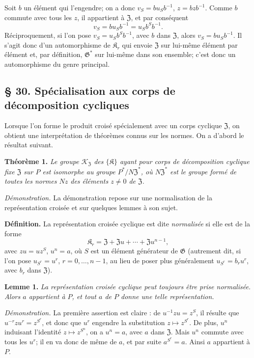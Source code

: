 Soit \(b\) un élément qui l'engendre; on a donc \(v_S=bu_Sb^{-1}\), \(z=bzb^{-1}\). Comme \(b\) commute avec tous les \(z\), il appartient à \(\mathfrak Z\), et par conséquent
\[
v_S=bu_Sb^{-1}=u_Sb^Sb^{-1}.
\]
Réciproquement, si l'on pose \(v_S=u_Sb^Sb^{-1}\), avec \(b\) dans \(\mathfrak Z\), alors \(v_S=bu_Sb^{-1}\). Il s'agit donc d'un automorphisme de \(\mathfrak K_r\) qui envoie \(\mathfrak Z\) sur lui-même élément par élément et, par définition, \(\mathfrak G^*\) sur lui-même dans son ensemble; c'est donc un automorphisme du genre principal.

\subsection*{\S{} 30. Spécialisation aux corps de décomposition cycliques}\label{fr-r823-corps-decomposition-cycliques}

Lorsque l'on forme le produit croisé spécialement avec un corps cyclique \(\mathfrak Z\), on obtient une interprétation de théorèmes connus sur les normes. On a d'abord le résultat suivant.

\noindent\textbf{Théorème 1.} \emph{Le groupe \(\mathscr K_{\mathfrak Z}\) des \(\{\mathfrak K\}\) ayant pour corps de décomposition cyclique fixe \(\mathfrak Z\) sur \(P\) est isomorphe au groupe \(P^*/N\mathfrak Z^*\), où \(N\mathfrak Z^*\) est le groupe formé de toutes les normes \(Nz\) des éléments \(z\neq0\) de \(\mathfrak Z\).}

\noindent\emph{Démonstration.} La démonstration repose sur une normalisation de la représentation croisée et sur quelques lemmes à son sujet.

\noindent\textbf{Définition.} La représentation croisée cyclique est dite \emph{normalisée} si elle est de la forme
\[
\mathfrak K_r=\mathfrak Z+\mathfrak Zu+\cdots+\mathfrak Zu^{n-1},
\]
avec \(zu=uz^S\), \(u^n=a\), où \(S\) est un élément générateur de \(\mathfrak G\) (autrement dit, si l'on pose \(u_{S^r}=u^r\), \(r=0,\ldots,n-1\), au lieu de poser plus généralement \(u_{S^r}=b_ru^r\), avec \(b_r\) dans \(\mathfrak Z\)).

\noindent\textbf{Lemme 1.} \emph{La représentation croisée cyclique peut toujours être prise normalisée. Alors \(a\) appartient à \(P\), et tout \(a\) de \(P\) donne une telle représentation.}

\noindent\emph{Démonstration.} La première assertion est claire : de \(u^{-1}zu=z^S\), il résulte que \(u^{-r}zu^r=z^{S^r}\), et donc que \(u^r\) engendre la substitution \(z\mapsto z^{S^r}\). De plus, \(u^n\) induisant l'identité \(z\mapsto z^{S^n}\), on a \(u^n=a\), avec \(a\) dans \(\mathfrak Z\). Mais \(u^n\) commute avec tous les \(u^r\); il en va donc de même de \(a\), et par suite \(a^{S^r}=a\). Ainsi \(a\) appartient à \(P\).

